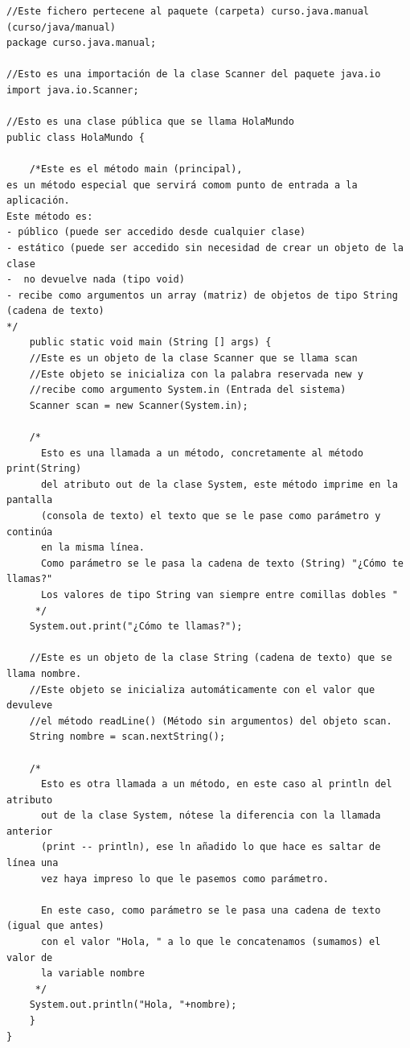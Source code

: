 \documentclass[11pt]{article}
\begin{document}
\begin{verbatim}
//Este fichero pertecene al paquete (carpeta) curso.java.manual (curso/java/manual)
package curso.java.manual;

//Esto es una importación de la clase Scanner del paquete java.io
import java.io.Scanner;

//Esto es una clase pública que se llama HolaMundo
public class HolaMundo {

    /*Este es el método main (principal), 
es un método especial que servirá comom punto de entrada a la aplicación. 
Este método es:
- público (puede ser accedido desde cualquier clase)
- estático (puede ser accedido sin necesidad de crear un objeto de la clase
-  no devuelve nada (tipo void)
- recibe como argumentos un array (matriz) de objetos de tipo String (cadena de texto)
*/
    public static void main (String [] args) {
	//Este es un objeto de la clase Scanner que se llama scan
	//Este objeto se inicializa con la palabra reservada new y
	//recibe como argumento System.in (Entrada del sistema)
	Scanner scan = new Scanner(System.in);

	/*
	  Esto es una llamada a un método, concretamente al método print(String)
	  del atributo out de la clase System, este método imprime en la pantalla
	  (consola de texto) el texto que se le pase como parámetro y continúa
	  en la misma línea.
	  Como parámetro se le pasa la cadena de texto (String) "¿Cómo te llamas?"
	  Los valores de tipo String van siempre entre comillas dobles "
	 */
	System.out.print("¿Cómo te llamas?");

	//Este es un objeto de la clase String (cadena de texto) que se llama nombre.
	//Este objeto se inicializa automáticamente con el valor que devuleve
	//el método readLine() (Método sin argumentos) del objeto scan.
	String nombre = scan.nextString();

	/*
	  Esto es otra llamada a un método, en este caso al println del atributo
	  out de la clase System, nótese la diferencia con la llamada anterior
	  (print -- println), ese ln añadido lo que hace es saltar de línea una
	  vez haya impreso lo que le pasemos como parámetro.

	  En este caso, como parámetro se le pasa una cadena de texto (igual que antes)
	  con el valor "Hola, " a lo que le concatenamos (sumamos) el valor de 
	  la variable nombre
	 */
	System.out.println("Hola, "+nombre);
    }
}
\end{verbatim}
\end{document}
